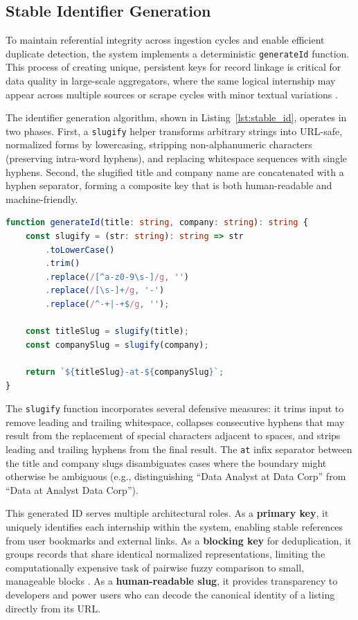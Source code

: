 \subsection{Stable Identifier Generation}

To maintain referential integrity across ingestion cycles and enable efficient duplicate detection, the system implements a deterministic \texttt{generateId} function. This process of creating unique, persistent keys for record linkage is critical for data quality in large-scale aggregators, where the same logical internship may appear across multiple sources or scrape cycles with minor textual variations \cite{christen2012data, elmagarmid2007duplicate}.

The identifier generation algorithm, shown in Listing~\ref{lst:stable_id}, operates in two phases. First, a \texttt{slugify} helper transforms arbitrary strings into URL-safe, normalized forms by lowercasing, stripping non-alphanumeric characters (preserving intra-word hyphens), and replacing whitespace sequences with single hyphens. Second, the slugified title and company name are concatenated with a hyphen separator, forming a composite key that is both human-readable and machine-friendly.

\begin{lstlisting}[language=TypeScript, caption=Stable ID Generation Logic, label=lst:stable_id]
function generateId(title: string, company: string): string {
    const slugify = (str: string): string => str
        .toLowerCase()
        .trim()
        .replace(/[^a-z0-9\s-]/g, '')
        .replace(/[\s-]+/g, '-')
        .replace(/^-+|-+$/g, '');

    const titleSlug = slugify(title);
    const companySlug = slugify(company);

    return `${titleSlug}-at-${companySlug}`;
}
\end{lstlisting}

The \texttt{slugify} function incorporates several defensive measures: it trims input to remove leading and trailing whitespace, collapses consecutive hyphens that may result from the replacement of special characters adjacent to spaces, and strips leading and trailing hyphens from the final result. The \texttt{at} infix separator between the title and company slugs disambiguates cases where the boundary might otherwise be ambiguous (e.g., distinguishing ``Data Analyst at Data Corp'' from ``Data at Analyst Data Corp'').

This generated ID serves multiple architectural roles. As a \textbf{primary key}, it uniquely identifies each internship within the system, enabling stable references from user bookmarks and external links. As a \textbf{blocking key} for deduplication, it groups records that share identical normalized representations, limiting the computationally expensive task of pairwise fuzzy comparison to small, manageable blocks \cite{christen2012data}. As a \textbf{human-readable slug}, it provides transparency to developers and power users who can decode the canonical identity of a listing directly from its URL.

